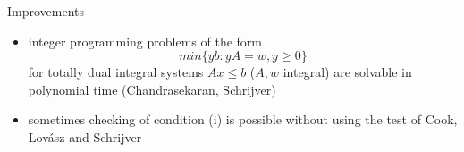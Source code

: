 \documentclass{beamer}
\begin{document}
\begin{frame}

	\begin{block}{Improvements}

		\begin{itemize}

			\item integer programming problems of the form \begin{equation*} min \{yb: yA=w, y\geq 0 \}\end{equation*} for totally dual integral systems $Ax \leq b$ ($A, w$ integral) are solvable in polynomial time (Chandrasekaran, Schrijver)

			\item sometimes checking of condition (i) is possible without using the test of Cook, Lovász and Schrijver

		\end{itemize}

	\end{block}

\end{frame}
\end{document}
